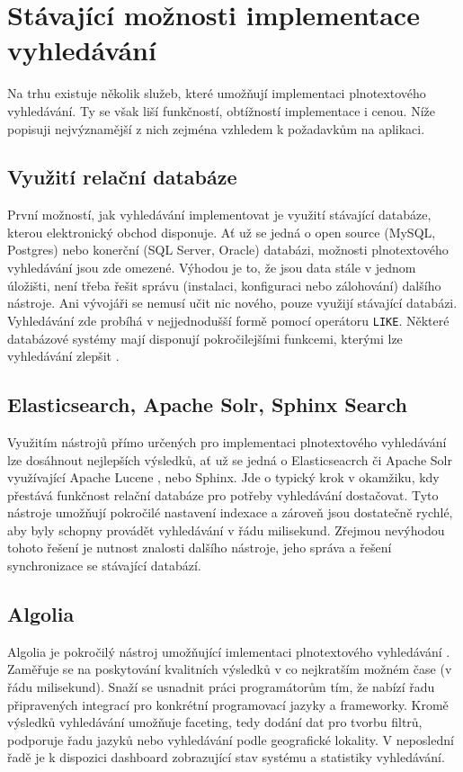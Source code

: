 \documentclass[FM,DP]{tulthesis}
\begin{document}
\section{Stávající možnosti implementace vyhledávání}

Na trhu existuje několik služeb, které umožňují implementaci plnotextového vyhledávání.
Ty se však liší funkčností, obtížností implementace i cenou. Níže popisuji nejvýznamější 
z nich zejména vzhledem k požadavkům na aplikaci.

\subsection{Využití relační databáze}

První možností, jak vyhledávání implementovat je využití stávající databáze, 
kterou elektronický obchod disponuje. Ať už se jedná o open source (MySQL, Postgres)
nebo konerční (SQL Server, Oracle) databázi, možnosti plnotextového vyhledávání
jsou zde omezené. Výhodou je to, že jsou data stále v jednom úložišti, není třeba
řešit správu (instalaci, konfiguraci nebo zálohování) dalšího nástroje. Ani vývojáři 
se nemusí učit nic nového, pouze využijí stávající databázi. Vyhledávání zde probíhá
v nejjednodušší formě pomocí operátoru \verb|LIKE|. Některé databázové systémy
mají disponují pokročilejšími funkcemi, kterými lze vyhledávání zlepšit \cite{postgres}.

\subsection{Elasticsearch, Apache Solr, Sphinx Search}

Využitím nástrojů přímo určených pro implementaci plnotextového vyhledávání lze 
dosáhnout nejlepších výsledků, ať už se jedná o Elasticseacrch či Apache Solr využívající
Apache Lucene \cite{lucene}, nebo Sphinx. Jde o typický krok v okamžiku, kdy
přestává funkčnost relační databáze pro potřeby vyhledávání dostačovat. Tyto nástroje
umožňují pokročilé nastavení indexace a zároveň jsou dostatečně rychlé, aby byly
schopny provádět vyhledávání v řádu milisekund. Zřejmou nevýhodou tohoto řešení
je nutnost znalosti dalšího nástroje, jeho správa a řešení synchronizace se 
stávající databází.

\subsection{Algolia}

Algolia je pokročilý nástroj umožňující imlementaci plnotextového vyhledávání \cite{algolia}. 
Zaměřuje se na poskytování kvalitních výsledků v co nejkratším možném čase (v řádu milisekund). 
Snaží se usnadnit práci programátorům tím, že nabízí řadu připravených integrací 
pro konkrétní programovací jazyky a frameworky. Kromě výsledků vyhledávání umožňuje 
faceting, tedy dodání dat pro tvorbu filtrů, podporuje řadu jazyků nebo vyhledávání 
podle geografické lokality. V neposlední řadě je k dispozici dashboard zobrazující 
stav systému a statistiky vyhledávání.
\end{document}

